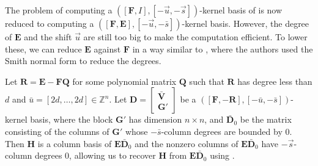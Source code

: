 The problem of computing a $\left(\left[\mathbf{F},I\right],\left[-\vec{u},-\vec{s}\right]\right)$-kernel
basis of is now reduced to computing a $\left(\left[\mathbf{F},\mathbf{E}\right],\left[-\vec{u},-\bar{s}\right]\right)$-kernel
basis. However, the degree of $\mathbf{E}$ and the shift $\vec{u}$
are still too big to make the computation efficient. To lower these,
we can reduce $\mathbf{E}$ against $\mathbf{F}$ in a way similar
to \citep{GS2011,G2011}, where the authors used the Smith normal
form to reduce the degrees. 
\begin{lem}
\label{lem:reduceToRemainder}Let $\mathbf{R}=\mathbf{E}-\mathbf{F}\mathbf{Q}$
for some polynomial matrix $\mathbf{Q}$ such that $\mathbf{R}$ has
degree less than $d$ and $\bar{u}=\left[2d,\dots,2d\right]\in\mathbb{Z}^{n}$.
Let $\mathbf{D}=\begin{bmatrix}\bar{\mathbf{V}}\\
\mathbf{G}'
\end{bmatrix}$ be a $\left(\left[\mathbf{F},-\mathbf{R}\right],\left[-\bar{u},-\bar{s}\right]\right)$-kernel
basis, where the block $\mathbf{G}'$ has dimension $n\times n$,
and $\bar{\mathbf{D}}_{0}$ be the matrix consisting of the columns
of $\mathbf{G}'$ whose $-\bar{s}$-column degrees are bounded by
0. Then $\mathbf{H}$ is a column basis of $\mathbf{E}\bar{\mathbf{D}}_{0}$
and the nonzero columns of $\mathbf{E}\bar{\mathbf{D}}_{0}$ have
$-\vec{s}$-column degrees 0, allowing us to recover $\mathbf{H}$
from $\mathbf{E}\bar{\mathbf{D}}_{0}$ using .\end{lem}
